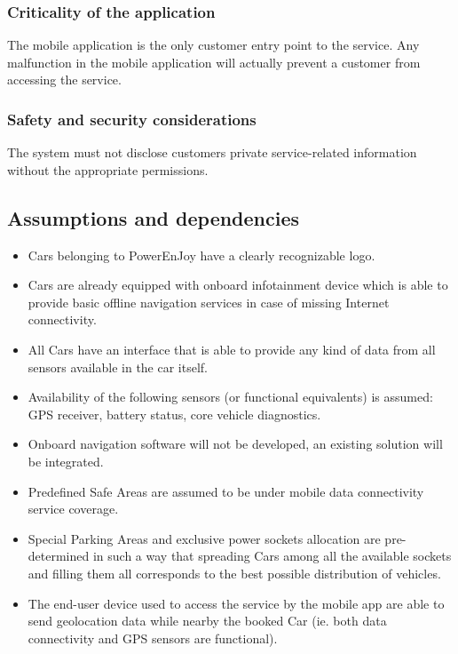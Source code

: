 \subsubsection{Criticality of the application}
The mobile application is the only customer entry point to the service. Any malfunction in the mobile application will actually prevent a customer from accessing the service.
\subsubsection{Safety and security considerations}
The system must not disclose customers private service-related information without the appropriate permissions.
\subsection{Assumptions and dependencies}
\begin{itemize}
\item Cars belonging to PowerEnJoy have a clearly recognizable logo.
\item Cars are already equipped with onboard infotainment device which is able to provide basic offline navigation services in case of missing Internet connectivity.
\item All Cars have an interface that is able to provide any kind of data from all sensors available in the car itself.
\item Availability of the following sensors (or functional equivalents) is assumed: GPS receiver, battery status, core vehicle diagnostics.
\item Onboard navigation software will not be developed, an existing solution will be integrated.
\item Predefined Safe Areas are assumed to be under mobile data connectivity service coverage.
\item Special Parking Areas and exclusive power sockets allocation are pre-determined in such a way that spreading Cars among all the available sockets and filling them all corresponds to the best possible distribution of vehicles.
\item The end-user device used to access the service by the mobile app are able to send geolocation data while nearby the booked Car (ie. both data connectivity and GPS sensors are functional).
\end{itemize}
